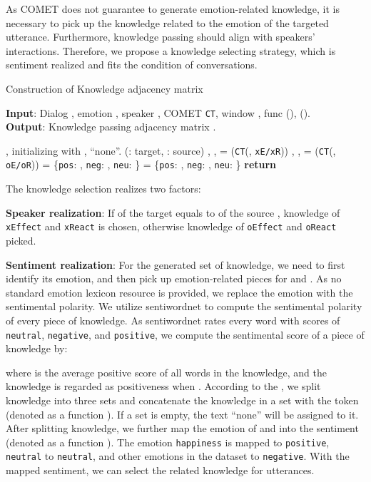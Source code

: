 \documentclass{article}
\begin{document}
As COMET does not guarantee to generate emotion-related knowledge, it is necessary to pick up the knowledge related to the emotion of the targeted utterance. Furthermore, knowledge passing should align with speakers' interactions. Therefore, we propose a knowledge selecting strategy, which is sentiment realized and fits the condition of conversations. 

\begin{algorithm}[tb]
\caption{Construction of Knowledge adjacency matrix}
\label{alg:algorithm}
\textbf{Input}: Dialog , emotion , speaker , COMET \texttt{CT}, window , func (), ().\\
\textbf{Output}: Knowledge passing adjacency matrix . 

\begin{algorithmic}[1] \STATE , initializing  with , ``none''. (: target, : source)
\STATE , ,  = (\texttt{CT}(, \texttt{xE/xR}))
\STATE , ,  = (\texttt{CT}(, \texttt{oE/oR}))
\IF{ == }
\STATE  = \{\texttt{pos}: , \texttt{neg}: , \texttt{neu}: \}
\ELSE 
\STATE  = \{\texttt{pos}: , \texttt{neg}: , \texttt{neu}: \}
\ENDIF
{}
\STATE 
{}
\STATE 
\ELSE
\STATE 
\ENDIF
\ENDIF
\ENDFOR
\ENDFOR
\STATE \textbf{return} 
\end{algorithmic}
\end{algorithm}

The knowledge selection realizes two factors:

\textbf{Speaker realization}: If  of the target  equals to  of the source , knowledge of \texttt{xEffect} and \texttt{xReact} is chosen, otherwise knowledge of \texttt{oEffect} and \texttt{oReact} picked. 

\textbf{Sentiment realization}: For the generated set of knowledge, we need to first identify its emotion, and then pick up emotion-related pieces for  and . As no standard emotion lexicon resource is provided, we replace the emotion with the sentimental polarity. We utilize sentiwordnet to compute the sentimental polarity of every piece of knowledge. As sentiwordnet rates every word with scores of \texttt{neutral}, \texttt{negative}, and \texttt{positive}, we compute the sentimental score of a piece of knowledge by:

where  is the average positive score of all words in the knowledge, and the knowledge is regarded as positiveness when . According to the , we split knowledge into three sets and concatenate the knowledge in a set with the token  (denoted as a function ). If a set is empty, the text ``none'' will be assigned to it. After splitting knowledge, we further map the emotion of  and  into the sentiment (denoted as a function ). The emotion \texttt{happiness} is mapped to \texttt{positive}, \texttt{neutral} to \texttt{neutral}, and other emotions in the dataset to \texttt{negative}. With the mapped sentiment, we can select the related knowledge for utterances. 
\end{document}
